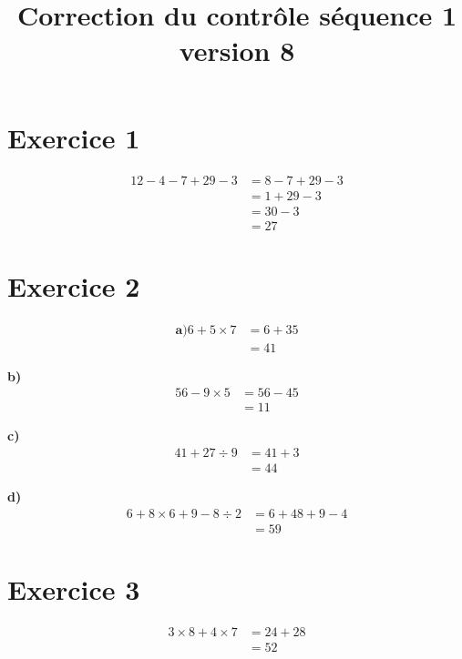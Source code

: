 \documentclass[12pt]{extarticle}
\title{\textbf{Correction du contrôle séquence 1 version 8}}
\author{}
\date{}
\begin{document}
\maketitle

\section*{Exercice 1}
\begin{align*}
12 - 4 - 7 + 29 - 3 &= 8 - 7 + 29 - 3 \\
                     &= 1 + 29 - 3 \\
                     &= 30 - 3 \\
                     &= 27
\end{align*}

\section*{Exercice 2}

\begin{align*}
\textbf{a)}
6 + 5 \times 7 &= 6 + 35 \\
               &= 41
\end{align*}

\textbf{b)}
\begin{align*}
56 - 9 \times 5 &= 56 - 45 \\
                &= 11
\end{align*}

\textbf{c)}
\begin{align*}
41 + 27 \div 9 &= 41 + 3 \\
               &= 44
\end{align*}

\textbf{d)}
\begin{align*}
6 + 8 \times 6 + 9 - 8 \div 2 &= 6 + 48 + 9 - 4 \\
                              &= 59
\end{align*}

\section*{Exercice 3}
\begin{align*}
3 \times 8 + 4 \times 7 &= 24 + 28 \\
                        &= 52
\end{align*}
\end{document}
